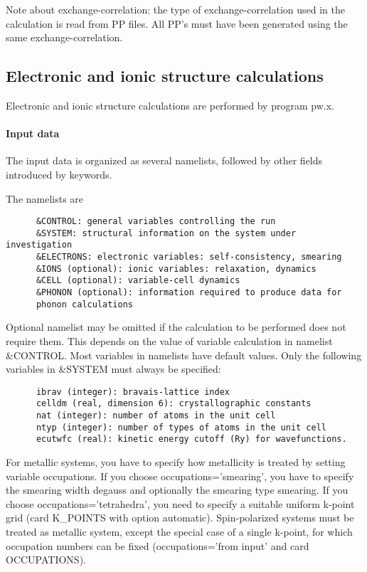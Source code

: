 \documentclass[12pt,a4paper]{article}
\begin{document}
Note about exchange-correlation: the type of exchange-correlation used
in the calculation is read from PP files. All PP's must have been generated
using the same exchange-correlation.

\subsection{Electronic and ionic structure calculations}

Electronic and ionic structure calculations are performed by program pw.x.

\paragraph{Input data}

The input data is organized as several namelists, followed by other fields
introduced by keywords.
    
The namelists are
\begin{verbatim}
      &CONTROL: general variables controlling the run
      &SYSTEM: structural information on the system under investigation
      &ELECTRONS: electronic variables: self-consistency, smearing
      &IONS (optional): ionic variables: relaxation, dynamics
      &CELL (optional): variable-cell dynamics
      &PHONON (optional): information required to produce data for
      phonon calculations
\end{verbatim}    
Optional namelist may be omitted if the calculation to be performed
does not require them. This depends on the value of variable calculation
in namelist \&CONTROL. Most variables in namelists have default values. Only
the following variables in \&SYSTEM must always be specified:
\begin{verbatim}
      ibrav (integer): bravais-lattice index
      celldm (real, dimension 6): crystallographic constants
      nat (integer): number of atoms in the unit cell
      ntyp (integer): number of types of atoms in the unit cell
      ecutwfc (real): kinetic energy cutoff (Ry) for wavefunctions.
\end{verbatim}    
For metallic systems, you have to specify how metallicity is treated
by setting 
variable occupations. If you choose occupations='smearing', you have
to specify the smearing width degauss and optionally the smearing type
smearing. If you choose occupations='tetrahedra', you need to specify 
a suitable uniform k-point grid (card K\_POINTS with option automatic).
Spin-polarized systems must be treated as metallic system, except the 
special case of a single k-point, for which occupation numbers can be fixed
(occupations='from input' and card OCCUPATIONS).
    
\end{document}

